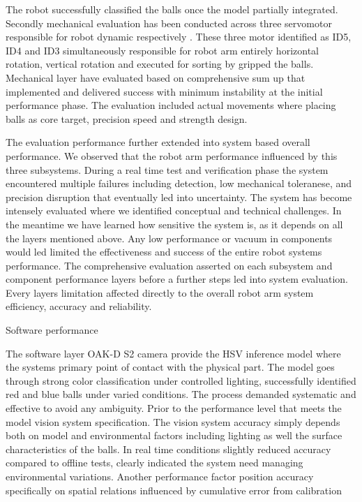 The robot successfully classified the balls once the model partially integrated. Secondly mechanical evaluation has been conducted across three servomotor responsible for robot dynamic respectively . These three motor identified as ID5, ID4 and ID3  simultaneously responsible for robot arm entirely horizontal rotation, vertical rotation and executed for sorting by gripped the balls. Mechanical layer have evaluated based on comprehensive sum up that implemented and delivered success with minimum instability at the initial performance phase. The evaluation included actual movements where placing balls as core target, precision speed and strength design.

 The evaluation performance further extended into system based overall performance. We observed that the robot arm performance influenced by this three subsystems. During a real time  test and verification phase the system encountered multiple  failures including detection, low mechanical toleranese, and precision disruption that eventually led into uncertainty. The system has become intensely evaluated where we identified conceptual and technical challenges. In the meantime we have learned how sensitive the system is, as it depends on all the layers mentioned above. Any low performance or vacuum in components would led limited the effectiveness and success of the entire robot systems performance. The comprehensive evaluation asserted on each subsystem and component performance layers before a further steps led into system evaluation. Every layers limitation affected directly to the overall robot arm system efficiency, accuracy and reliability.

Software performance

The software layer OAK-D S2 camera provide the HSV inference model where the systems primary point of contact with the physical part. The model goes through strong color classification under controlled lighting, successfully identified red and blue balls under varied conditions. The process demanded systematic and effective to avoid any ambiguity. Prior to the performance level that meets the model vision system specification. The vision system accuracy simply depends both on model and environmental factors including lighting as well the surface  characteristics of the balls. In real time conditions slightly reduced accuracy compared to offline tests, clearly indicated the system need managing environmental variations. Another performance factor position accuracy specifically on spatial relations influenced by cumulative error from calibration 

